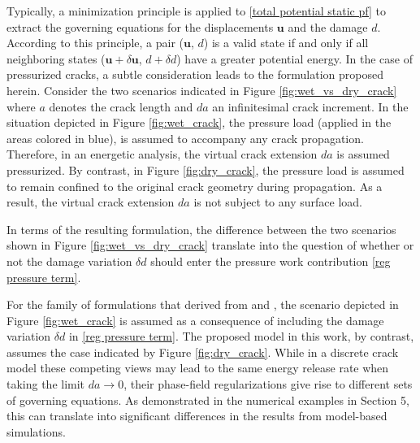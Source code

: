 Typically, a minimization principle is applied to \eqref{total potential static pf} to extract the governing equations for the displacements $\textbf{u}$ and the damage $d$. According to this principle, a pair ($\textbf{u}$, $d$) is a valid state if and only if all neighboring states ($\textbf{u} + \delta\textbf{u} $, $d+\delta d$) have a greater potential energy. In the case of pressurized cracks, a subtle consideration leads to the formulation proposed herein. Consider the two scenarios indicated in Figure \ref{fig:wet_vs_dry_crack} where $a$ denotes the crack length and $da$ an infinitesimal crack increment. In the situation depicted in Figure \ref{fig:wet_crack}, the pressure load (applied in the areas colored in blue), is assumed to accompany any crack propagation. Therefore, in an energetic analysis, the virtual crack extension $da$ is assumed  pressurized. By contrast, in Figure \ref{fig:dry_crack}, the pressure load is assumed to remain confined to the original crack geometry during propagation.  As a result, the virtual crack extension $da$ is not subject to any surface load.

In terms of the resulting formulation, the difference between the two scenarios shown in Figure \ref{fig:wet_vs_dry_crack} translate into the question of whether or not the damage variation $\delta d$ should enter the pressure work contribution \eqref{reg pressure term}.

For the family of formulations that derived from \cite{bourdin2012variational} and \cite{wheeler2014augmented}, the scenario depicted in Figure \ref{fig:wet_crack} is assumed as a consequence of including the damage variation $\delta d$ in \eqref{reg pressure term}. The proposed model in this work, by contrast, assumes the case indicated by Figure \ref{fig:dry_crack}. While in a discrete crack model these competing views may lead to the same energy release rate when taking the limit $da \rightarrow 0$, their phase-field regularizations give rise to different sets of governing equations. As demonstrated in the numerical examples in Section 5, this can translate into significant differences in the results from model-based simulations.  

